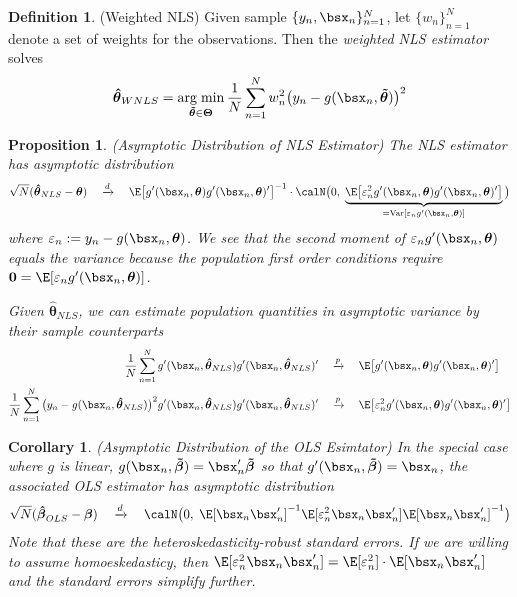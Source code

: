 \documentclass[12pt]{article}
\theoremstyle{plain}
\newtheorem{prop}[thm]{Proposition}
\newtheorem{cor}[thm]{Corollary}
\theoremstyle{definition}
\newtheorem{defn}[thm]{Definition}
\theoremstyle{remark}
\newcommand{\bstheta}{\boldsymbol{\theta}}
\newcommand{\bsTheta}{\boldsymbol{\Theta}}
\newcommand{\bsbeta}{\boldsymbol{\beta}}
\newcommand{\bshatbeta}{\boldsymbol{\hat{\beta}}}
\newcommand{\bshattheta}{\boldsymbol{\hat{\theta}}}
\newcommand{\bstildebeta}{\boldsymbol{\tilde{\beta}}}
\newcommand{\bstildetheta}{\boldsymbol{\tilde{\theta}}}
\renewcommand{\bso}{\boldsymbol{0}}
\DeclareMathOperator*{\argmin}{arg\;min}
\newcommand{\Var}{\operatorname{Var}}
\newcommand{\pto}{\xrightarrow{p}}
\newcommand{\dto}{\xrightarrow{d}}
\newcommand{\sumnN}{\sum^N_{n=1}}
\newcommand{\nN}{_{n=1}^N}
\begin{document}
\begin{defn}(Weighted NLS)
Given sample $\{y_n,\bsx_n\}\nN$, let $\{w_n\}\nN$ denote a set of
weights for the observations. Then the \emph{weighted NLS estimator}
solves
\begin{align}
  \bshattheta_{WNLS}
  = \argmin_{\bstildetheta\in\bsTheta}
  \frac{1}{N}\sumnN w_n^2\big(y_n-g(\bsx_n,\bstildetheta)\big)^2
  \label{wnls}
\end{align}
\end{defn}


\begin{prop}\emph{(Asymptotic Distribution of NLS Estimator)}
The NLS estimator has asymptotic distribution
\begin{align*}
  \sqrt{N}(\bshattheta_{NLS}-\bstheta)
  \quad\dto\quad
  \E\big[
  g'(\bsx_n,\bstheta)g'(\bsx_n,\bstheta)'
  \big]^{-1}
  \cdot
  \calN\big(0,\;
  \underbrace{%
  \E\big[\varepsilon_n^2g'(\bsx_n,\bstheta)g'(\bsx_n,\bstheta)'\big]
  }_{=\Var[\varepsilon_ng'(\bsx_n,\bstheta)]}
  \big)
\end{align*}
where $\varepsilon_n:=y_n-g(\bsx_n,\bstheta)$.  We see that the second
moment of $\varepsilon_n g'(\bsx_n,\bstheta)$ equals the variance
because the population first order conditions require
$\bso = \E[\varepsilon_n g'(\bsx_n,\bstheta)]$.

Given $\bshattheta_{NLS}$, we can estimate population quantities in
asymptotic variance by their sample counterparts
\begin{align*}
  \frac{1}{N}\sumnN
  g'(\bsx_n,\bshattheta_{NLS})g'(\bsx_n,\bshattheta_{NLS})'
  \quad&\pto\quad
  \E\big[
  g'(\bsx_n,\bstheta)g'(\bsx_n,\bstheta)'
  \big]
  \\
  \frac{1}{N}\sumnN
  \big(y_n-g(\bsx_n,\bshattheta_{NLS})\big)^2
  g'(\bsx_n,\bshattheta_{NLS})g'(\bsx_n,\bshattheta_{NLS})'
  \quad&\pto\quad
  \E\big[\varepsilon_n^2
  g'(\bsx_n,\bstheta)g'(\bsx_n,\bstheta)'
  \big]
  \notag
\end{align*}
\end{prop}
\begin{cor}\emph{(Asymptotic Distribution of the OLS Esimtator)}
In the special case where $g$ is linear,
$g(\bsx_n,\bstildebeta)=\bsx_n'\bstildebeta$ so that
$g'(\bsx_n,\bstildebeta)=\bsx_n$, the associated OLS estimator has
asymptotic distribution
\begin{align*}
  \sqrt{N}(\bshatbeta_{OLS}-\bsbeta)
  \quad\dto\quad
  \calN\big(0,\;
  \E[ \bsx_n\bsx_n' ]^{-1}
  \E[\varepsilon_n^2 \bsx_n\bsx_n' ]
  \E[ \bsx_n\bsx_n' ]^{-1}
  \big)
\end{align*}
Note that these are the heteroskedasticity-robust standard errors. If we
are willing to assume homoeskedasticy, then
$\E[\varepsilon_n^2\bsx_n\bsx_n']=\E[\varepsilon_n^2]\cdot\E[\bsx_n\bsx_n']$
and the standard errors simplify further.
\end{cor}
\end{document}
